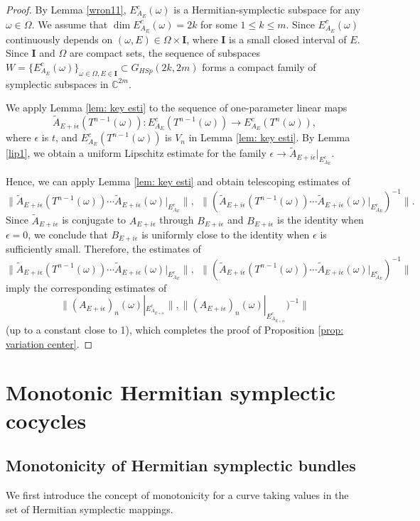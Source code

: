 \documentclass[11pt]{amsart}
\theoremstyle{remark}
\theoremstyle{definition}
\newcommand{\I}{{\mathbf I}}
\begin{document}
\begin{proof}
By Lemma \ref{wron11}, $E^c_{A_E}(\omega)$ is a Hermitian-symplectic subspace for any $\omega\in\Omega$. We assume that $\dim E^c_{A_E}(\omega)=2k$ for some $1\leq k\leq m$. Since $E^c_{A_E}(\omega)$ continuously depends on $(\omega,E)\in\Omega\times \I$, where $\I$ is a small closed interval of $E$. Since $\I$ and $\Omega$ are compact sets, the sequence of subspaces $W=\{E^c_{A_E}(\omega)\}_{\omega\in\Omega,E\in \I}\subset G_{HSp}(2k,2m)$ forms a compact family of symplectic subspaces in $\mathbb{C}^{2m}$.

We apply Lemma \ref{lem: key esti} to the sequence of one-parameter linear maps $$
\tilde A_{E+i\epsilon}(T^{n-1}(\omega)): E^c_{A_E}(T^{n-1}(\omega))\to E^c_{A_E}(T^{n}(\omega)),
$$ where $\epsilon$ is $t$, and $E^c_{A_E}(T^{n-1}(\omega))$ is $V_n$ in Lemma \ref{lem: key esti}. By Lemma \ref{lip1}, we obtain a uniform Lipschitz estimate for the family $\epsilon\to \tilde A_{E+i\epsilon}|_{E^c_{A_E}}$.

Hence, we can apply Lemma \ref{lem: key esti} and obtain telescoping estimates of $$
\|\tilde A_{E+i\epsilon}(T^{n-1}(\omega))\cdots \tilde A_{E+i\epsilon}(\omega)|_{E^c_{A_E}}\|,~~ \|(\tilde A_{E+i\epsilon}(T^{n-1}(\omega))\cdots \tilde A_{E+i\epsilon}(\omega)|_{E^c_{A_E}})^{-1}\|.
$$ Since $\tilde A_{E+i\epsilon}$ is conjugate to $A_{E+i\epsilon}$ through $B_{E+i\epsilon}$ and $B_{E+i\epsilon}$ is the identity when $\epsilon=0$, we conclude that $B_{E+i\epsilon}$ is uniformly close to the identity when $\epsilon$ is sufficiently small. Therefore, the estimates of $$
\|\tilde A_{E+i\epsilon}(T^{n-1}(\omega))\cdots \tilde A_{E+i\epsilon}(\omega)|_{E^c_{A_E}}\|,~~ \|(\tilde A_{E+i\epsilon}(T^{n-1}(\omega))\cdots \tilde A_{E+i\epsilon}(\omega)|_{E^c_{A_E}})^{-1}\|
$$ imply the corresponding estimates of $$
\|(A_{E+i\epsilon})_{n}(\omega)|_{E^c_{A_{E+i\epsilon}}}\|, \|(A_{E+i\epsilon})_{n}(\omega)|_{E^c_{A_{E+i\epsilon}}})^{-1}\|
$$ (up to a constant close to 1), which completes the proof of Proposition \ref{prop: variation center}.
\end{proof}



\section{Monotonic Hermitian symplectic cocycles}\label{idea2}





 \subsection{Monotonicity of Hermitian symplectic bundles}       
We first introduce the concept of monotonicity for a curve taking values in the set of Hermitian symplectic mappings. 
        
\end{document}
